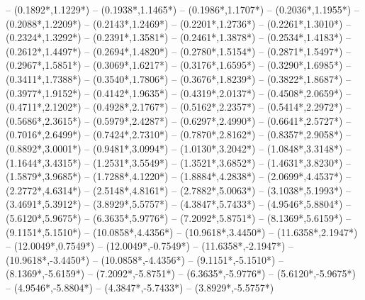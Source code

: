 {	-- ({0.1892*\dx},{1.1229*\dy})
	-- ({0.1938*\dx},{1.1465*\dy})
	-- ({0.1986*\dx},{1.1707*\dy})
	-- ({0.2036*\dx},{1.1955*\dy})
	-- ({0.2088*\dx},{1.2209*\dy})
	-- ({0.2143*\dx},{1.2469*\dy})
	-- ({0.2201*\dx},{1.2736*\dy})
	-- ({0.2261*\dx},{1.3010*\dy})
	-- ({0.2324*\dx},{1.3292*\dy})
	-- ({0.2391*\dx},{1.3581*\dy})
	-- ({0.2461*\dx},{1.3878*\dy})
	-- ({0.2534*\dx},{1.4183*\dy})
	-- ({0.2612*\dx},{1.4497*\dy})
	-- ({0.2694*\dx},{1.4820*\dy})
	-- ({0.2780*\dx},{1.5154*\dy})
	-- ({0.2871*\dx},{1.5497*\dy})
	-- ({0.2967*\dx},{1.5851*\dy})
	-- ({0.3069*\dx},{1.6217*\dy})
	-- ({0.3176*\dx},{1.6595*\dy})
	-- ({0.3290*\dx},{1.6985*\dy})
	-- ({0.3411*\dx},{1.7388*\dy})
	-- ({0.3540*\dx},{1.7806*\dy})
	-- ({0.3676*\dx},{1.8239*\dy})
	-- ({0.3822*\dx},{1.8687*\dy})
	-- ({0.3977*\dx},{1.9152*\dy})
	-- ({0.4142*\dx},{1.9635*\dy})
	-- ({0.4319*\dx},{2.0137*\dy})
	-- ({0.4508*\dx},{2.0659*\dy})
	-- ({0.4711*\dx},{2.1202*\dy})
	-- ({0.4928*\dx},{2.1767*\dy})
	-- ({0.5162*\dx},{2.2357*\dy})
	-- ({0.5414*\dx},{2.2972*\dy})
	-- ({0.5686*\dx},{2.3615*\dy})
	-- ({0.5979*\dx},{2.4287*\dy})
	-- ({0.6297*\dx},{2.4990*\dy})
	-- ({0.6641*\dx},{2.5727*\dy})
	-- ({0.7016*\dx},{2.6499*\dy})
	-- ({0.7424*\dx},{2.7310*\dy})
	-- ({0.7870*\dx},{2.8162*\dy})
	-- ({0.8357*\dx},{2.9058*\dy})
	-- ({0.8892*\dx},{3.0001*\dy})
	-- ({0.9481*\dx},{3.0994*\dy})
	-- ({1.0130*\dx},{3.2042*\dy})
	-- ({1.0848*\dx},{3.3148*\dy})
	-- ({1.1644*\dx},{3.4315*\dy})
	-- ({1.2531*\dx},{3.5549*\dy})
	-- ({1.3521*\dx},{3.6852*\dy})
	-- ({1.4631*\dx},{3.8230*\dy})
	-- ({1.5879*\dx},{3.9685*\dy})
	-- ({1.7288*\dx},{4.1220*\dy})
	-- ({1.8884*\dx},{4.2838*\dy})
	-- ({2.0699*\dx},{4.4537*\dy})
	-- ({2.2772*\dx},{4.6314*\dy})
	-- ({2.5148*\dx},{4.8161*\dy})
	-- ({2.7882*\dx},{5.0063*\dy})
	-- ({3.1038*\dx},{5.1993*\dy})
	-- ({3.4691*\dx},{5.3912*\dy})
	-- ({3.8929*\dx},{5.5757*\dy})
	-- ({4.3847*\dx},{5.7433*\dy})
	-- ({4.9546*\dx},{5.8804*\dy})
	-- ({5.6120*\dx},{5.9675*\dy})
	-- ({6.3635*\dx},{5.9776*\dy})
	-- ({7.2092*\dx},{5.8751*\dy})
	-- ({8.1369*\dx},{5.6159*\dy})
	-- ({9.1151*\dx},{5.1510*\dy})
	-- ({10.0858*\dx},{4.4356*\dy})
	-- ({10.9618*\dx},{3.4450*\dy})
	-- ({11.6358*\dx},{2.1947*\dy})
	-- ({12.0049*\dx},{0.7549*\dy})
	-- ({12.0049*\dx},{-0.7549*\dy})
	-- ({11.6358*\dx},{-2.1947*\dy})
	-- ({10.9618*\dx},{-3.4450*\dy})
	-- ({10.0858*\dx},{-4.4356*\dy})
	-- ({9.1151*\dx},{-5.1510*\dy})
	-- ({8.1369*\dx},{-5.6159*\dy})
	-- ({7.2092*\dx},{-5.8751*\dy})
	-- ({6.3635*\dx},{-5.9776*\dy})
	-- ({5.6120*\dx},{-5.9675*\dy})
	-- ({4.9546*\dx},{-5.8804*\dy})
	-- ({4.3847*\dx},{-5.7433*\dy})
	-- ({3.8929*\dx},{-5.5757*\dy})
}
